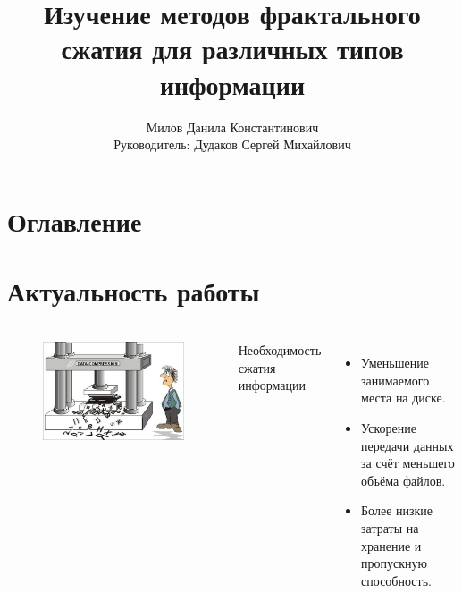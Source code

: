 \documentclass[t aspectratio=169]{beamer}
\title{Изучение методов фрактального сжатия для различных типов информации}
\author[author1]{Милов Данила Константинович\\[10mm]{\small Руководитель: Дудаков Сергей Михайлович}}
\begin{document}
  \begin{frame}
    \maketitle
  \end{frame}

  \section*{Оглавление}
  \begin{frame}\frametitle{\insertsection}
    \large
    \tableofcontents
    \normalfont
  \end{frame}

  \section{Актуальность работы}
  \begin{frame}\frametitle{\insertsection}
    \begin{columns}
      \begin{figure}
        \begin{center}
          \includegraphics[width=1\textwidth]{./images/compression-illustration.jpg}
        \end{center}
      \end{figure}
      \large Необходимость сжатия информации
      \begin{itemize}
        \item Уменьшение занимаемого места на диске.
        \item Ускорение передачи данных за счёт меньшего объёма файлов.
        \item Более низкие затраты на хранение и пропускную способность.
      \end{itemize}
    \normalsize
    \end{columns}
  \end{frame}
\end{document}
